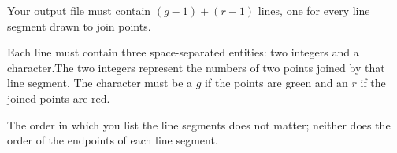 Your output file must contain $(g - 1) + (r - 1)$ lines, one for every line
segment drawn to join points.

Each line must contain three space-separated entities: two integers
and a character.The two integers represent the numbers of two
points joined by that line segment. The character must be a $g$ if the
points are green and an $r$ if the joined points are red.

The order in which you list the line segments does not matter; neither
does the order of the endpoints of each line segment.